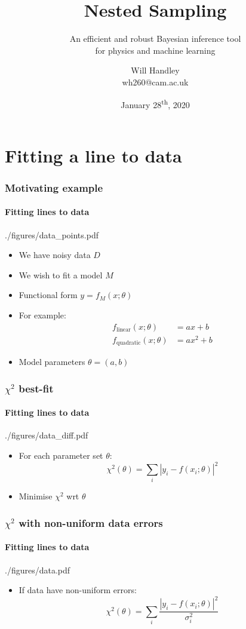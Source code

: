 \documentclass[%
]{beamer}
\title{Nested Sampling}
\subtitle{An efficient and robust Bayesian inference tool\\ for physics and machine learning}
\author[Handley] %
{Will Handley\\ \small{wh260@cam.ac.uk}}
\institute[University of Cambridge] %
{%
Kavli Institute for Cosmology \\
Astrophysics Group \\
Cavendish Laboratory \\
University of Cambridge
}
\date{January 28\textsuperscript{th}, 2020}
\begin{document}
\begin{frame}
  \titlepage
\end{frame}

\section{Fitting a line to data}
\begin{frame}
    \frametitle{Motivating example}
    \framesubtitle{Fitting lines to data}
    \begin{figright}[0.4]{./figures/data_points.pdf}
        \begin{itemize}
            \item We have noisy data $D$
            \item We wish to fit a model $M$
            \item Functional form $y=f_M(x;\theta)$
            \item For example:
                \begin{align}
                     f_\text{linear}(x;\theta)&=a x + b       \nonumber\\
                     f_\text{quadratic}(x;\theta)&=a x^2 + b  \nonumber
                \end{align}
            \item Model parameters $\theta= (a,b)$
        \end{itemize}
    \end{figright}
\end{frame}

\begin{frame}
    \frametitle{$\chi^2$ best-fit}
    \framesubtitle{Fitting lines to data}
    \begin{figright}[0.4]{./figures/data_diff.pdf}
        \begin{itemize}
            \item For each parameter set $\theta$:
                \[
                    \chi^2(\theta) = \sum_i \left|y_i - f(x_i;\theta)\right|^2
                \]
            \item Minimise $\chi^2$ wrt $\theta$
        \end{itemize}
    \end{figright}
\end{frame}

\begin{frame}
    \frametitle{$\chi^2$ with non-uniform data errors}
    \framesubtitle{Fitting lines to data}
    \begin{figright}[0.4]{./figures/data.pdf}
        \begin{itemize}
            \item If data have non-uniform errors:
                \[
                    \chi^2(\theta) = \sum_i \frac{\left|y_i - f(x_i;\theta)\right|^2}{\sigma_i^2}
                \]
        \end{itemize}
    \end{figright}
\end{frame}
\end{document}
